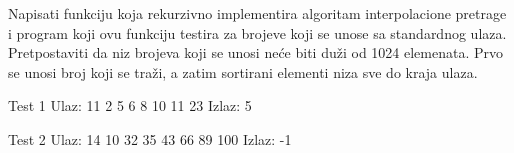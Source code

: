 \begin{Exercise}[label=407]
  Napisati funkciju koja rekurzivno implementira algoritam
  interpolacione pretrage i program koji ovu funkciju testira za
  brojeve koji se unose sa standardnog ulaza. Pretpostaviti da niz
  brojeva koji se unosi neće biti duži od 1024 elemenata. Prvo se
  unosi broj koji se traži, a zatim sortirani elementi niza sve do
  kraja ulaza.
  
\begin{miditest}
\begin{test}{Test 1}
Ulaz:   11 2 5 6 8 10 11 23
Izlaz:  5
\end{test}
\end{miditest}

\begin{miditest}
\begin{test}{Test 2}
Ulaz:   14 10 32 35 43 66 89 100
Izlaz:  -1  
\end{test}
\end{miditest}
  
\end{Exercise}

